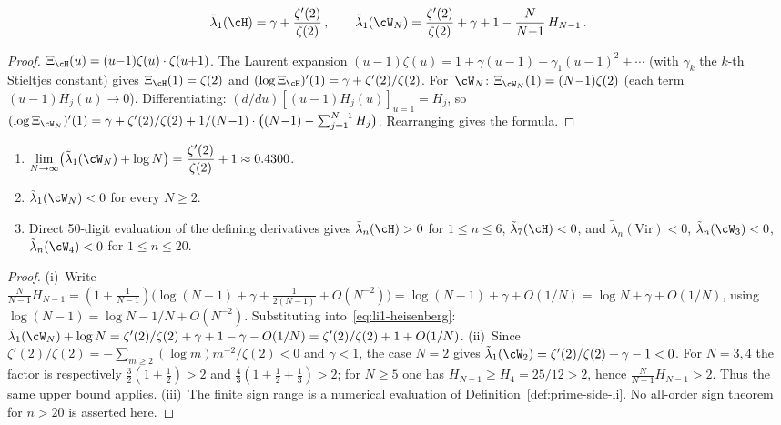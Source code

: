 \begin{theorem}[\ClaimStatusProvedHere]%
\label{thm:li-closed-form}%
%
\begin{equation}\label{eq:li1-heisenberg}
\tilde\lambda_1(\cH) = \gamma + \frac{\zeta'(2)}{\zeta(2)}\,,
\qquad
\tilde\lambda_1(\cW_N)
= \frac{\zeta'(2)}{\zeta(2)} + \gamma + 1
 - \frac{N}{N{-}1}\,H_{N-1}\,.
\end{equation}
\end{theorem}

\begin{proof}
$\Xi_\cH(u) = (u{-}1)\zeta(u)\cdot\zeta(u{+}1)$.
The Laurent expansion $(u{-}1)\zeta(u) =
1 + \gamma(u{-}1) + \gamma_1(u{-}1)^2 + \cdots$
(with $\gamma_k$ the $k$-th Stieltjes constant)
gives $\Xi_\cH(1) = \zeta(2)$ and
$(\log\Xi_\cH)'(1)
= \gamma + \zeta'(2)/\zeta(2)$.
For~$\cW_N$:
$\Xi_{\cW_N}(1) = (N{-}1)\zeta(2)$
(each term $(u{-}1)H_j(u) \to 0$).
Differentiating:
$(d/du)[(u{-}1)H_j(u)]_{u=1} = H_j$,
so
$(\log\Xi_{\cW_N})'(1)
= \gamma + \zeta'(2)/\zeta(2)
+ 1/(N{-}1) \cdot
\bigl((N{-}1) - \sum_{j=1}^{N-1}H_j\bigr)$.
Rearranging gives the formula.
\end{proof}

\begin{theorem}%
\label{thm:li-asymptotics}%
%
\begin{enumerate}[label=\textup{(\roman*)}]
\item
$\displaystyle
\lim_{N \to \infty}
\bigl(\tilde\lambda_1(\cW_N) + \log N\bigr)
= \frac{\zeta'(2)}{\zeta(2)} + 1
\approx 0.4300$.
\item
$\tilde\lambda_1(\cW_N)<0$ for every $N\geq2$.
\item
Direct 50-digit evaluation of the defining derivatives gives
$\tilde\lambda_n(\cH) > 0$ for $1 \leq n \leq 6$,
$\tilde\lambda_7(\cH) < 0$, and
$\tilde\lambda_n(\mathrm{Vir})<0$,
$\tilde\lambda_n(\cW_3)<0$,
$\tilde\lambda_n(\cW_4)<0$ for $1\leq n\leq20$.
\end{enumerate}
\end{theorem}

\begin{proof}
(i)~Write $\frac{N}{N{-}1}H_{N-1}
= (1 + \tfrac{1}{N{-}1})
\bigl(\log(N{-}1) + \gamma + \tfrac{1}{2(N{-}1)} + O(N^{-2})\bigr)
= \log(N{-}1) + \gamma + O(1/N)
= \log N + \gamma + O(1/N)$,
using $\log(N{-}1) = \log N - 1/N + O(N^{-2})$.
Substituting into~\eqref{eq:li1-heisenberg}:
$\tilde\lambda_1(\cW_N) + \log N
= \zeta'(2)/\zeta(2) + \gamma + 1 - \gamma - O(1/N)
= \zeta'(2)/\zeta(2) + 1 + O(1/N)$.
(ii)~Since
$\zeta'(2)/\zeta(2)=-\sum_{m\geq2}(\log m)m^{-2}/\zeta(2)<0$
and $\gamma<1$, the case $N=2$ gives
$\tilde\lambda_1(\cW_2)=\zeta'(2)/\zeta(2)+\gamma-1<0$.
For $N=3,4$ the factor is respectively
$\frac32(1+\frac12)>2$ and
$\frac43(1+\frac12+\frac13)>2$; for $N\geq5$ one has
$H_{N-1}\geq H_4=25/12>2$, hence
$\frac{N}{N-1}H_{N-1}>2$.  Thus the same upper bound applies.
(iii)~The finite sign range is a numerical evaluation of
Definition~\ref{def:prime-side-li}. No all-order sign theorem for
$n>20$ is asserted here.
\end{proof}

